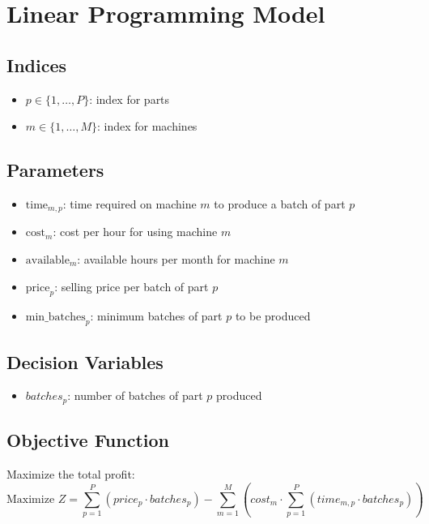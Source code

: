\documentclass{article}
\begin{document}
\section*{Linear Programming Model}

\subsection*{Indices}
\begin{itemize}
    \item \( p \in \{1, \ldots, P\} \): index for parts
    \item \( m \in \{1, \ldots, M\} \): index for machines
\end{itemize}

\subsection*{Parameters}
\begin{itemize}
    \item \( \text{time}_{m,p} \): time required on machine \( m \) to produce a batch of part \( p \)
    \item \( \text{cost}_{m} \): cost per hour for using machine \( m \)
    \item \( \text{available}_{m} \): available hours per month for machine \( m \)
    \item \( \text{price}_{p} \): selling price per batch of part \( p \)
    \item \( \text{min\_batches}_{p} \): minimum batches of part \( p \) to be produced
\end{itemize}

\subsection*{Decision Variables}
\begin{itemize}
    \item \( batches_{p} \): number of batches of part \( p \) produced
\end{itemize}

\subsection*{Objective Function}
Maximize the total profit:
\[
\text{Maximize } Z = \sum_{p=1}^{P} (price_{p} \cdot batches_{p}) - \sum_{m=1}^{M} (cost_{m} \cdot \sum_{p=1}^{P} (time_{m,p} \cdot batches_{p}))
\]
\end{document}
